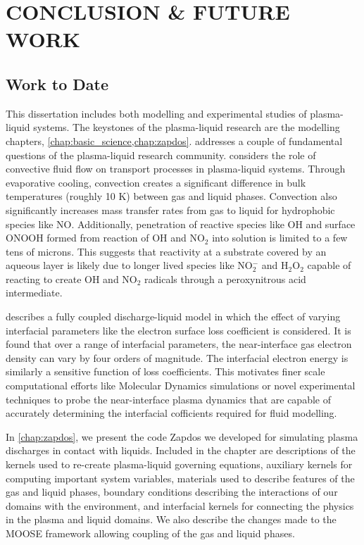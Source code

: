 \chapter{CONCLUSION \& FUTURE WORK}
\label{chap:conclusion}

\section{Work to Date}

This dissertation includes both modelling and experimental studies of plasma-liquid systems. The keystones of the plasma-liquid research are the modelling chapters, \cref{chap:basic_science,chap:zapdos}.  addresses a couple of fundamental questions of the plasma-liquid research community.  considers the role of convective fluid flow on transport processes in plasma-liquid systems. Through evaporative cooling, convection creates a significant difference in bulk temperatures (roughly 10 K) between gas and liquid phases. Convection also significantly increases mass transfer rates from gas to liquid for hydrophobic species like NO. Additionally, penetration of reactive species like OH and surface ONOOH formed from reaction of OH and NO$_2$ into solution is limited to a few tens of microns. This suggests that reactivity at a substrate covered by an aqueous layer is likely due to longer lived species like NO$_2^-$ and H$_2$O$_2$ capable of reacting to create OH and NO$_2$ radicals through a peroxynitrous acid intermediate.

 describes a fully coupled discharge-liquid model in which the effect of varying interfacial parameters like the electron surface loss coefficient is considered. It is found that over a range of interfacial parameters, the near-interface gas electron density can vary by four orders of magnitude. The interfacial electron energy is similarly a sensitive function of loss coefficients. This motivates finer scale computational efforts like Molecular Dynamics simulations or novel experimental techniques to probe the near-interface plasma dynamics that are capable of accurately determining the interfacial cofficients required for fluid modelling.

In \cref{chap:zapdos}, we present the code Zapdos we developed for simulating plasma discharges in contact with liquids. Included in the chapter are descriptions of the kernels used to re-create plasma-liquid governing equations, auxiliary kernels for computing important system variables, materials used to describe features of the gas and liquid phases, boundary conditions describing the interactions of our domains with the environment, and interfacial kernels for connecting the physics in the plasma and liquid domains. We also describe the changes made to the MOOSE framework allowing coupling of the gas and liquid phases.


